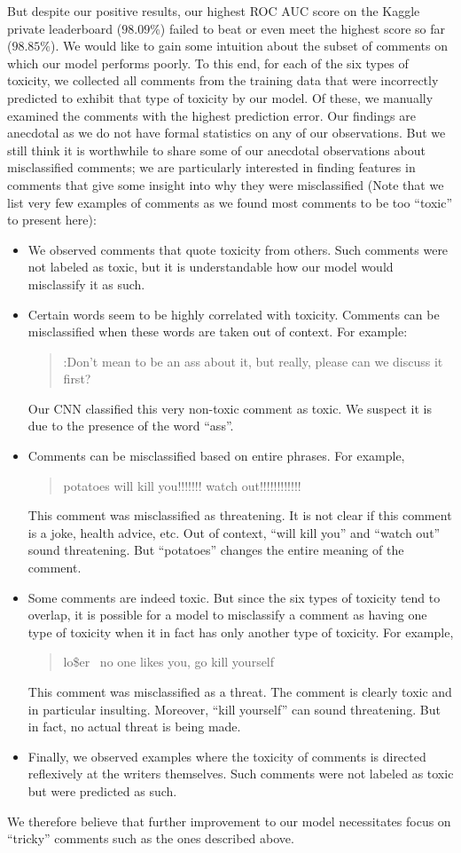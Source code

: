\documentclass[12pt]{article}
\begin{document}
But despite our positive results, our highest ROC AUC score on the Kaggle private leaderboard ($98.09\%$) failed to beat or even meet the highest score so far ($98.85\%$). We would like to gain some intuition about the subset of comments on which our model performs poorly. To this end, for each of the six types of toxicity, we collected all comments from the training data that were incorrectly predicted to exhibit that type of toxicity by our model. Of these, we manually examined the comments with the highest prediction error. Our findings are anecdotal as we do not have formal statistics on any of our observations. But we still think it is worthwhile to share some of our anecdotal observations about misclassified comments; we are particularly interested in finding features in comments that give some insight into why they were misclassified (Note that we list very few examples of comments as we found most comments to be too ``toxic'' to present here):
\begin{itemize}
\item We observed comments that quote toxicity from others. Such comments were not labeled as toxic, but it is understandable how our model would misclassify it as such.
\item Certain words seem to be highly correlated with toxicity. Comments can be misclassified when these words are taken out of context. For example:
\begin{quote}
:Don't mean to be an ass about it, but really, please can we discuss it first?
\end{quote}
Our CNN classified this very non-toxic comment as toxic. We suspect it is due to the presence of the word ``ass''.
\item Comments can be misclassified based on entire phrases. For example,
\begin{quote}
potatoes will kill you!!!!!!! watch out!!!!!!!!!!!!
\end{quote}
This comment was misclassified as threatening. It is not clear if this comment is a joke, health advice, etc. Out of context, ``will kill you'' and ``watch out'' sound threatening. But ``potatoes'' changes the entire meaning of the comment.
\item Some comments are indeed toxic. But since the six types of toxicity tend to overlap, it is possible for a model to misclassify a comment as having one type of toxicity when it in fact has only another type of toxicity. For example,
\begin{quote}
lo\$er 
\
no one likes you, go kill yourself
\end{quote}
This comment was misclassified as a threat. The comment is clearly toxic and in particular insulting. Moreover, ``kill yourself'' can sound threatening. But in fact, no actual threat is being made.
\item Finally, we observed examples where the toxicity of comments is directed reflexively at the writers themselves. Such comments were not labeled as toxic but were predicted as such.
\end{itemize}
We therefore believe that further improvement to our model necessitates focus on ``tricky'' comments such as the ones described above.
\end{document}
